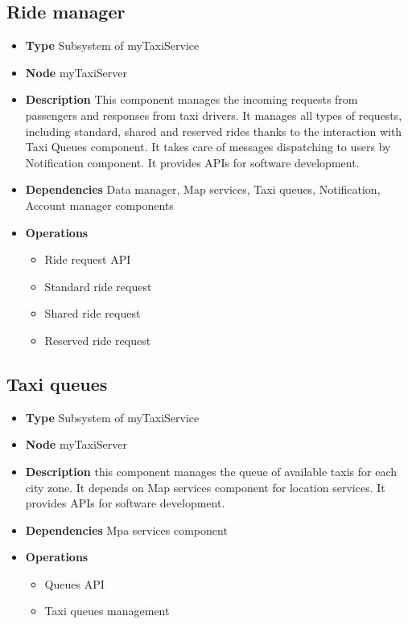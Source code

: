 \subsection{Ride manager}
\begin{itemize}
	\item[]\textbf{Type} Subsystem of myTaxiService
	\item[]\textbf{Node} myTaxiServer
	\item[]\textbf{Description} This component manages the incoming requests from passengers and responses from taxi drivers. It manages all types of requests, including standard, shared and reserved rides thanks to the interaction with Taxi Queues component. It takes care of messages dispatching to users by Notification component. It provides APIs for software development.
	\item[]\textbf{Dependencies} Data manager, Map services, Taxi queues, Notification, Account manager components
	\item[]\textbf{Operations}\begin{itemize}
		\item Ride request API
		\item Standard ride request
		\item Shared ride request
		\item Reserved ride request
	\end{itemize}
\end{itemize}

\subsection{Taxi queues}
\begin{itemize}
	\item[]\textbf{Type} Subsystem of myTaxiService
	\item[]\textbf{Node} myTaxiServer
	\item[]\textbf{Description} this component manages the queue of available taxis for each city zone. It depends on Map services component for location services. It provides APIs for software development.
	\item[]\textbf{Dependencies} Mpa services component
	\item[]\textbf{Operations} \begin{itemize}
		\item Queues API
		\item Taxi queues management
	\end{itemize}
\end{itemize}

